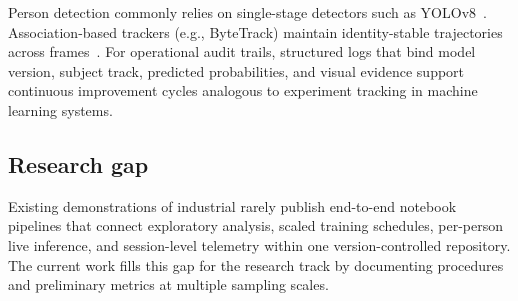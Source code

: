 Person detection commonly relies on single-stage detectors such as YOLOv8~\cite{jocher2023yolov8}.
Association-based trackers (e.g., ByteTrack) maintain identity-stable trajectories across frames~\cite{zhang2022bytetrack}.
For operational audit trails, structured logs that bind model version, subject track, predicted probabilities, and visual evidence support continuous improvement cycles analogous to experiment tracking in machine learning systems.

\subsection{Research gap}

Existing demonstrations of industrial \har{} rarely publish end-to-end notebook pipelines that connect exploratory analysis, scaled training schedules, per-person live inference, and session-level telemetry within one version-controlled repository.
The current work fills this gap for the \visionops{} research track by documenting procedures and preliminary metrics at multiple sampling scales.
